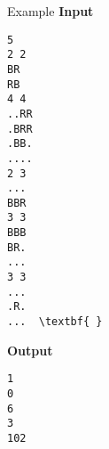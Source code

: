 Example
\textbf{Input }
\begin{verbatim}
5
2 2
BR
RB
4 4
..RR
.BRR
.BB.
....
2 3
...
BBR
3 3
BBB
BR.
...
3 3
...
.R.
...  \textbf{ }\end{verbatim}

\textbf{Output }
\begin{verbatim}
1
0
6
3
102\end{verbatim}